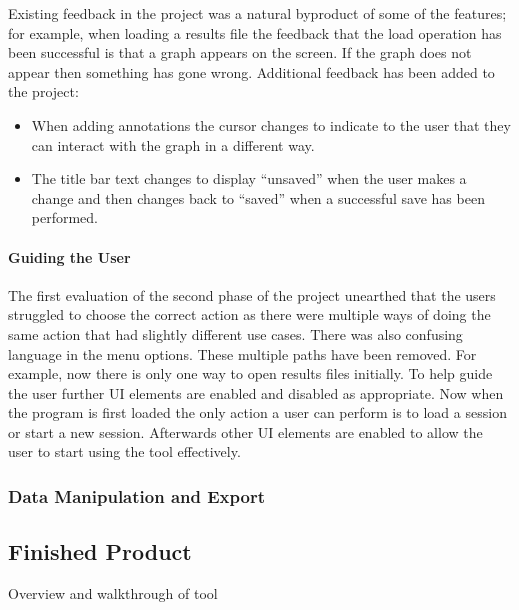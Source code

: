 Existing feedback in the project was a natural byproduct of some of the features; for example, when loading a results file the feedback that the load operation has been successful is that a graph appears on the screen. If the graph does not appear then something has gone wrong.  Additional feedback has been added to the project:
\begin{itemize}
\item When adding annotations the cursor changes to indicate to the user that they can interact with the graph in a different way.
\item The title bar text changes to display ``unsaved'' when the user makes a change and then changes back to ``saved'' when a successful save has been performed.
\end{itemize}

\paragraph{Guiding the User}

The first evaluation of the second phase of the project unearthed that the users struggled to choose the correct action as there were multiple ways of doing the same action that had slightly different use cases.  There was also confusing language in the menu options.  These multiple paths have been removed. For example, now there is only one way to open results files initially.  To help guide the user further \ac{UI} elements are enabled and disabled as appropriate.  Now when the program is first loaded the only action a user can perform is to load a session or start a new session.  Afterwards other \ac{UI} elements are enabled to allow the user to start using the tool effectively.

\subsubsection{Data Manipulation and Export}

\subsection{Finished Product}
Overview and walkthrough of tool
